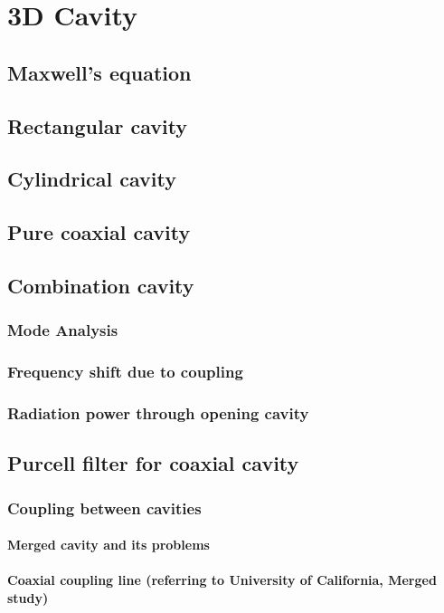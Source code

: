 \chapter{3D Cavity}
\section{Maxwell's equation}

\section{Rectangular cavity}

\section{Cylindrical cavity}

\section{Pure coaxial cavity}

\section{Combination cavity }
\subsection{Mode Analysis}
\subsection{Frequency shift due to coupling}
\subsection{Radiation power through opening cavity}

\section{Purcell filter for coaxial cavity}
\subsection{Coupling between cavities}
\subsubsection{Merged cavity and its problems}
\subsubsection{Coaxial coupling line (referring to University of California, Merged study)}

